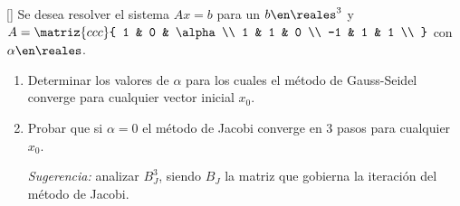 \begin{enunciado}{\ejExtra}
  {\tiny []}
  Se desea resolver el sistema $Ax = b$ para un $b \en \reales^3$ y
  $A = \matriz{ccc}{
      1 & 0 & \alpha \\
      1 & 1 & 0 \\
      -1 & 1 & 1 \\
    }$
  con $\alpha \en \reales$.
  \begin{enumerate}[label=(\alph*)]
    \item Determinar los valores de $\alpha$ para los cuales el método de Gauss-Seidel converge para cualquier vector inicial $x_0$.

    \item Probar que si $\alpha = 0$ el método de Jacobi converge en 3 pasos para cualquier $x_0$.

          \textit{Sugerencia:} analizar $B_J^3$, siendo $B_J$ la matriz que gobierna la iteración del método de Jacobi.
  \end{enumerate}
\end{enunciado}

